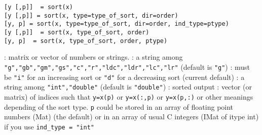 
\begin{mandesc}
\end{mandesc}

\begin{calling_sequence}
\begin{verbatim}
[y [,p]]  = sort(x)
[y [,p]] = sort(x, type=type_of_sort, dir=order)
[y, p] = sort(x, type=type_of_sort, dir=order, ind_type=ptype)
[y [,p]]  = sort(x, type_of_sort, order)
[y, p]  = sort(x, type_of_sort, order, ptype)
\end{verbatim}
\end{calling_sequence}
\begin{parameters}
  \begin{varlist}
    :  matrix or vector of numbers or strings.
    : a string among
    \verb+"g","gb","gm","gs","c","r","ldc","ldr","lc","lr"+ (default
    is \verb+"g"+)
    : must be \verb+"i"+ for an increasing sort or \verb+"d"+ for a
                    decreasing sort (current default)
    : a string among
    \verb+"int","double"+ (default is \verb+"double"+)
    : sorted output
    : vector (or matrix) of indices such that \verb+y=x(p)+
    or  \verb+y=x(:,p)+ or  \verb+y=x(p,:)+ or other meanings
    depending of the sort type. \verb+p+ could be stored in an array of
    floating point numbers (Mat) (the default) or in an array of 
    usual C integers (IMat of itype int) if you use \verb+ind_type = "int"+
  \end{varlist}
\end{parameters}

